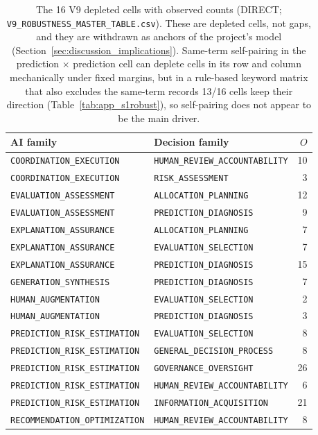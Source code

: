 \begin{table}[tbp]
\centering
\caption{The 16 V9 depleted cells with observed counts (DIRECT; \texttt{V9\_ROBUSTNESS\_MASTER\_TABLE.csv}). These are depleted cells, not gaps, and they are withdrawn as anchors of the project's model (Section~\ref{sec:discussion_implications}). Same-term self-pairing in the prediction $\times$ prediction cell can deplete cells in its row and column mechanically under fixed margins, but in a rule-based keyword matrix that also excludes the same-term records 13/16 cells keep their direction (Table~\ref{tab:app_s1robust}), so self-pairing does not appear to be the main driver.}
\label{tab:app_v9cells}
\footnotesize
\begin{tabular}{llr}
\toprule
AI family & Decision family & $O$ \\
\midrule
\texttt{COORDINATION\_EXECUTION} & \texttt{HUMAN\_REVIEW\_ACCOUNTABILITY} & 10 \\
\texttt{COORDINATION\_EXECUTION} & \texttt{RISK\_ASSESSMENT} & 3 \\
\texttt{EVALUATION\_ASSESSMENT} & \texttt{ALLOCATION\_PLANNING} & 12 \\
\texttt{EVALUATION\_ASSESSMENT} & \texttt{PREDICTION\_DIAGNOSIS} & 9 \\
\texttt{EXPLANATION\_ASSURANCE} & \texttt{ALLOCATION\_PLANNING} & 7 \\
\texttt{EXPLANATION\_ASSURANCE} & \texttt{EVALUATION\_SELECTION} & 7 \\
\texttt{EXPLANATION\_ASSURANCE} & \texttt{PREDICTION\_DIAGNOSIS} & 15 \\
\texttt{GENERATION\_SYNTHESIS} & \texttt{PREDICTION\_DIAGNOSIS} & 7 \\
\texttt{HUMAN\_AUGMENTATION} & \texttt{EVALUATION\_SELECTION} & 2 \\
\texttt{HUMAN\_AUGMENTATION} & \texttt{PREDICTION\_DIAGNOSIS} & 3 \\
\texttt{PREDICTION\_RISK\_ESTIMATION} & \texttt{EVALUATION\_SELECTION} & 8 \\
\texttt{PREDICTION\_RISK\_ESTIMATION} & \texttt{GENERAL\_DECISION\_PROCESS} & 8 \\
\texttt{PREDICTION\_RISK\_ESTIMATION} & \texttt{GOVERNANCE\_OVERSIGHT} & 26 \\
\texttt{PREDICTION\_RISK\_ESTIMATION} & \texttt{HUMAN\_REVIEW\_ACCOUNTABILITY} & 6 \\
\texttt{PREDICTION\_RISK\_ESTIMATION} & \texttt{INFORMATION\_ACQUISITION} & 21 \\
\texttt{RECOMMENDATION\_OPTIMIZATION} & \texttt{HUMAN\_REVIEW\_ACCOUNTABILITY} & 8 \\
\bottomrule
\end{tabular}
\end{table}

